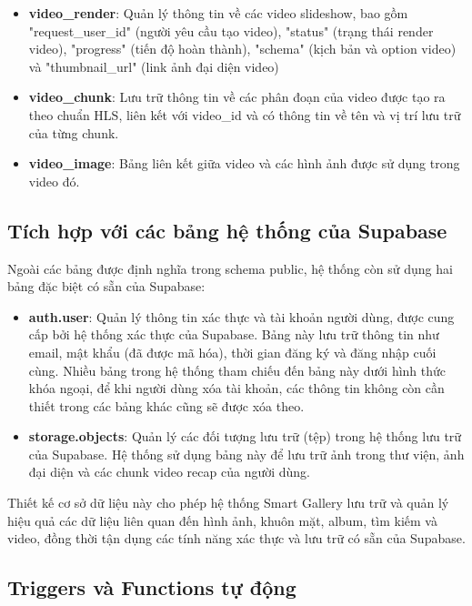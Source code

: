 \begin{itemize}
    \item \textbf{video\_render}: Quản lý thông tin về các video slideshow, bao gồm "request\_user\_id" (người yêu cầu tạo video), "status" (trạng thái render video), "progress" (tiến độ hoàn thành), "schema" (kịch bản và option video) và "thumbnail\_url" (link ảnh đại diện video)
    
    \item \textbf{video\_chunk}: Lưu trữ thông tin về các phân đoạn của video được tạo ra theo chuẩn HLS, liên kết với video\_id và có thông tin về tên và vị trí lưu trữ của từng chunk.
    
    \item \textbf{video\_image}: Bảng liên kết giữa video và các hình ảnh được sử dụng trong video đó.
\end{itemize}

\subsection{Tích hợp với các bảng hệ thống của Supabase}

Ngoài các bảng được định nghĩa trong schema public, hệ thống còn sử dụng hai bảng đặc biệt có sẵn của Supabase:

\begin{itemize}
    \item \textbf{auth.user}: Quản lý thông tin xác thực và tài khoản người dùng, được cung cấp bởi hệ thống xác thực của Supabase. Bảng này lưu trữ thông tin như email, mật khẩu (đã được mã hóa), thời gian đăng ký và đăng nhập cuối cùng. Nhiều bảng trong hệ thống tham chiếu đến bảng này dưới hình thức khóa ngoại, để khi người dùng xóa tài khoản, các thông tin không còn cần thiết trong các bảng khác cũng sẽ được xóa theo.
    
    \item \textbf{storage.objects}: Quản lý các đối tượng lưu trữ (tệp) trong hệ thống lưu trữ của Supabase. Hệ thống sử dụng bảng này để lưu trữ ảnh trong thư viện, ảnh đại diện và các chunk video recap của người dùng.
\end{itemize}

Thiết kế cơ sở dữ liệu này cho phép hệ thống Smart Gallery lưu trữ và quản lý hiệu quả các dữ liệu liên quan đến hình ảnh, khuôn mặt, album, tìm kiếm và video, đồng thời tận dụng các tính năng xác thực và lưu trữ có sẵn của Supabase.

\subsection{Triggers và Functions tự động}

